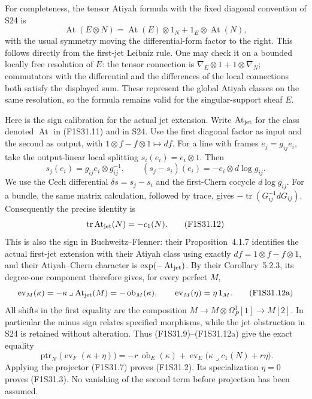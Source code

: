 For completeness, the tensor Atiyah formula with the
fixed diagonal convention of S24 is
\[
 \operatorname{At}(E\otimes N)
   =\operatorname{At}(E)\otimes1_N
                +1_E\otimes\operatorname{At}(N),
 \tag{F1S31.11}
\]
with the usual symmetry moving the differential-form
factor to the right. This follows directly from the
first-jet Leibniz rule. One may check it on a bounded
locally free resolution of $E$: the tensor connection
is $\nabla_E\otimes1+1\otimes\nabla_N$; commutators with
the differential and the differences of the local
connections both satisfy the displayed sum. These
represent the global Atiyah classes on the same
resolution, so the formula remains valid for the
singular-support sheaf $E$.

Here is the sign calibration for the actual jet extension.
Write $\operatorname{At}_{\rm jet}$ for the class
denoted $\operatorname{At}$ in (F1S31.11) and in S24.
Use the first diagonal factor as input and the second
as output, with
$1\otimes f-f\otimes1\mapsto df$.
For a line with frames $e_j=g_{ij}e_i$, take the
output-linear local splitting $s_i(e_i)=e_i\otimes1$.
Then
\[
 s_j(e_i)=g_{ij}e_i\otimes g_{ij}^{-1},\qquad
 (s_j-s_i)(e_i)=-e_i\otimes d\log g_{ij}.
\]
We use the Cech differential $\delta s=s_j-s_i$ and
the first-Chern cocycle $d\log g_{ij}$. For a bundle,
the same matrix calculation, followed by trace,
gives $-\operatorname{tr}(G_{ij}^{-1}dG_{ij})$.
Consequently the precise identity is
\[
                     \operatorname{tr}\operatorname{At}_{\rm jet}(N)
                                      =-c_1(N).
 \tag{F1S31.12}
\]
This is also the sign in Buchweitz--Flenner:
their Proposition~4.1.7 identifies the actual
first-jet extension with their Atiyah class using
exactly $df=1\otimes f-f\otimes1$, and their
Atiyah--Chern character is
$\exp(-\operatorname{At}_{\rm jet})$.
By their Corollary~5.2.3, its degree-one component
therefore gives, for every perfect $M$,
\[
 \operatorname{ev}_M(\kappa)
       =-\kappa\mathbin{\lrcorner}\operatorname{At}_{\rm jet}(M)
       =-\operatorname{ob}_M(\kappa),
 \qquad
 \operatorname{ev}_M(\eta)=\eta\,1_M.
 \tag{F1S31.12a}
\]
All shifts in the first equality are the composition
$M\to M\otimes\Omega_P^1[1]\to M[2]$.
In particular the minus sign relates specified
morphisms, while the jet obstruction in S24 is
retained without alteration.
Thus (F1S31.9)--(F1S31.12a)
give the exact equality
\[
 \operatorname{ptr}_N
    \bigl(\operatorname{ev}_F(\kappa+\eta)\bigr)
 =-r\,\operatorname{ob}_E(\kappa)
   +\operatorname{ev}_E\bigl(
                    \kappa\mathbin{\lrcorner}c_1(N)+r\eta\bigr).
 \tag{F1S31.13}
\]
Applying the projector (F1S31.7) proves (F1S31.2).
Its specialization $\eta=0$ proves (F1S31.3).
No vanishing of the second term before projection
has been assumed.

